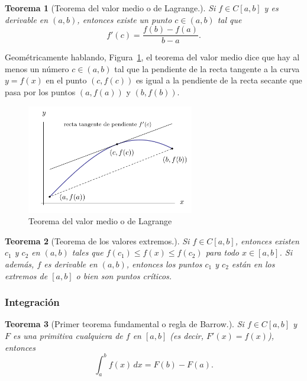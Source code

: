 \documentclass[12pt]{article}
\newtheorem{Teo}{Teorema}
\begin{document}
\begin{Teo}[Teorema del valor medio o de Lagrange.]
Si $f\in C[a, b]$ y es derivable en $(a,b)$, entonces existe un punto $c\in (a,b)$ tal que
$$f'(c) = \frac{f(b) - f(a)}{b - a}.$$
\end{Teo}

Geométricamente hablando, Figura~\ref{fig:lagrange}, el teorema del valor medio dice que hay al menos un número $c \in (a, b) $ tal que la pendiente de la recta tangente a la curva $y = f(x) $ en el punto $(c, f(c)) $ es igual a la pendiente de la recta secante que pasa por los puntos $(a, f(a)) $ y $(b, f(b)) $.

\begin{figure}[H]
\centering
\includegraphics[width=0.65\textwidth]{Fig3.png}
\caption{Teorema del valor medio o de Lagrange}
\label{fig:lagrange}
\end{figure}

\begin{Teo}[Teorema de los valores extremos.]  
Si $f \in C[a,b] $, entonces existen $c_1 $ y $c_2 $ en $(a,b) $ tales que $f(c_1) \leq f(x) \leq f(c_2) $ para todo $x \in [a,b] $. Si además, $f $ es derivable en $(a,b) $, entonces los puntos $c_1 $ y $c_2 $ están en los extremos de $[a,b] $ o bien son puntos críticos.
\end{Teo}

\subsubsection{Integración}


\begin{Teo}[Primer teorema fundamental o regla de Barrow.]
  Si $f \in C[a, b] $ y $F $ es una primitiva cualquiera de $f $ en $[a, b] $ (es decir, $F'(x) = f(x) $), entonces $$\int_a^b f(x) \, dx = F(b) - F(a). $$
\end{Teo}
\end{document}
